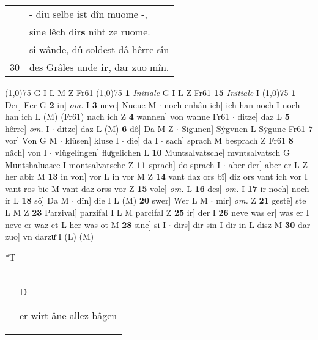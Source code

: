 \documentclass[8pt,a4paper,notitlepage]{article}
\begin{document}
\begin{table}[ht]
\begin{minipage}[t]{0.5\linewidth}
\begin{tabular}{rl}
 & - diu selbe ist dîn muome -,\\ 
 & sine lêch dir\textbf{s} niht ze ruome.\\ 
 & si wânde, dû soldest dâ hêrre sîn\\ 
30 & des Grâles unde \textbf{ir}, dar zuo mîn.\\ 
\end{tabular}
\scriptsize
\line(1,0){75} \newline
G I L M Z Fr61 \newline
\line(1,0){75} \newline
\textbf{1} \textit{Initiale} G I L Z Fr61  \textbf{15} \textit{Initiale} I  \newline
\line(1,0){75} \newline
\textbf{1} Der] Eer G \textbf{2} in] \textit{om.} I \textbf{3} neve] Nueue M  $\cdot$ noch enhân ich] ich han noch I noch han ich L (M) (Fr61) nach ich Z \textbf{4} wannen] von wanne Fr61  $\cdot$ ditze] daz L \textbf{5} hêrre] \textit{om.} I  $\cdot$ ditze] daz L (M) \textbf{6} dô] Da M Z  $\cdot$ Sigunen] Sýgvnen L Sẏgune Fr61 \textbf{7} vor] Von G M  $\cdot$ klûsen] kluse I  $\cdot$ die] da I  $\cdot$ sach] sprach M besprach Z Fr61 \textbf{8} nâch] von I  $\cdot$ vlügelingen] fluͯgelichen L \textbf{10} Muntsalvatsche] mvntsalvatsch G Muntshaluasce I montsalvatsche Z \textbf{11} sprach] do sprach I  $\cdot$ aber der] aber er L Z her abir M \textbf{13} in von] vor L in vor M Z \textbf{14} vant daz ors bî] diz ors vant ich vor I vant ros bie M vant daz orss vor Z \textbf{15} volc] \textit{om.} L \textbf{16} des] \textit{om.} I \textbf{17} ir noch] noch ir L \textbf{18} sô] Da M  $\cdot$ dîn] die I L (M) \textbf{20} swer] Wer L M  $\cdot$ mir] \textit{om.} Z \textbf{21} gestê] ste L M Z \textbf{23} Parzival] parzifal I L M parcifal Z \textbf{25} ir] der I \textbf{26} neve was er] was er I neve er waz et L her was ot M \textbf{28} sine] si I  $\cdot$ dirs] dir sin I dir in L disz M \textbf{30} dar zuo] vn darzuͤ I (L) (M) \newline
\end{minipage}
\hspace{0.5cm}
\begin{minipage}[t]{0.5\linewidth}
\small
\begin{center}*T
\end{center}
\begin{tabular}{rl}
 & \begin{large}D\end{large}er wirt âne allez bâgen\\ 

\end{tabular}
\end{minipage}
\end{table}
\end{document}
